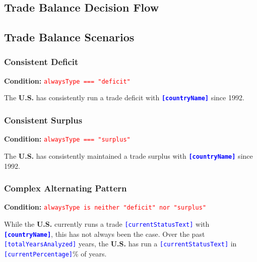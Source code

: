 \documentclass[12pt]{article}
\newcommand{\var}[1]{\textcolor{blue}{\texttt{[#1]}}}
\newcommand{\bold}[1]{\textbf{#1}}
\newcommand{\cond}[1]{\textcolor{red}{\texttt{#1}}}
\begin{document}
\subsection{Trade Balance Decision Flow}


\subsection{Trade Balance Scenarios}

\subsubsection{Consistent Deficit}
\textbf{Condition:} \cond{alwaysType === "deficit"}

The \bold{U.S.} has consistently run a trade deficit with \bold{\var{countryName}} since 1992.

\subsubsection{Consistent Surplus}
\textbf{Condition:} \cond{alwaysType === "surplus"}

The \bold{U.S.} has consistently maintained a trade surplus with \bold{\var{countryName}} since 1992.

\subsubsection{Complex Alternating Pattern}
\textbf{Condition:} \cond{alwaysType is neither "deficit" nor "surplus"}

While the \bold{U.S.} currently runs a trade \var{currentStatusText} with \bold{\var{countryName}}, this has not always been the case. Over the past \var{totalYearsAnalyzed} years, the \bold{U.S.} has run a \var{currentStatusText} in \var{currentPercentage}\% of years.
\end{document}
